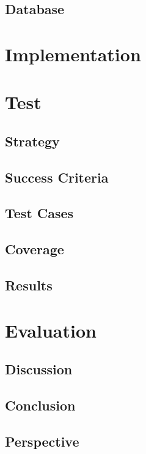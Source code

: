 		\section{Database}

	\chapter{Implementation}
	
	\chapter{Test}
		\section{Strategy}
		\section{Success Criteria}
		\section{Test Cases}
		\section{Coverage}
		\section{Results}
	
	\chapter{Evaluation}
		\section{Discussion}
		\section{Conclusion}
		\section{Perspective}
	
	\cleardoublepage
{}
\label{chap:bib}

\listoffigures
\lstlistoflistings

\appendix	

